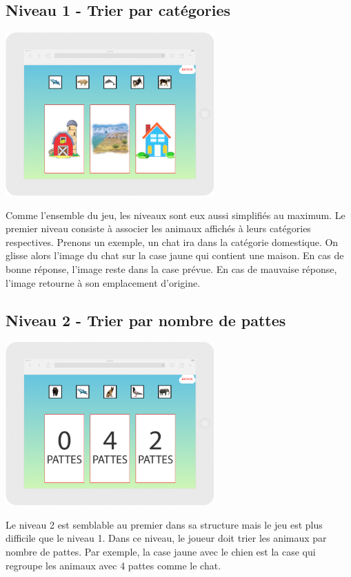 \documentclass{article}
\begin{document}
\subsection{Niveau 1 - Trier par catégories}
\vspace{0.5cm}
\begin{center}
\includegraphics[width=0.6\textwidth]{page2}
\end{center}
\vspace{0.5cm}
\hspace*{0.6cm}Comme l'ensemble du jeu, les niveaux sont eux aussi simplifiés au maximum.
Le premier niveau consiste à associer les animaux affichés à leurs catégories respectives. Prenons un exemple, un chat ira dans la catégorie domestique. On glisse alors l'image du chat sur la case jaune qui contient une maison. En cas de bonne réponse, l'image reste dans la case prévue. En cas de mauvaise réponse, l'image retourne à son emplacement d'origine.
\subsection{Niveau 2 - Trier par nombre de pattes}
\vspace{0.5cm}
\begin{center}
\includegraphics[width=0.6\textwidth]{page3}
\end{center}
\vspace{0.5cm}
\hspace*{0.6cm}Le niveau 2 est semblable au premier dans sa structure mais le jeu est plus difficile que le niveau 1. Dans ce niveau, le joueur doit trier les animaux par nombre de pattes. Par exemple, la case jaune avec le chien est la case qui regroupe les animaux avec 4 pattes comme le chat.
\end{document}
